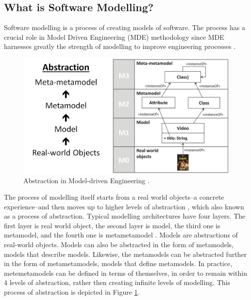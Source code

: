 \documentclass[12pt, a4paper]{report}
\begin{document}
\subsection{What is Software Modelling?}
Software modelling is a process of creating models of software. The process has a crucial role in Model Driven Engineering (MDE) methodology since MDE harnesses greatly the strength of modelling to improve engineering processes \cite{brambilla2012model}.  

\begin{figure}[!b]
\centering
\includegraphics[width=13cm]{abstraction}
\caption{Abstraction in Model-driven Engineering \cite{brambilla2012model}.}
\label{abstraction}
\end{figure}

The process of modelling itself starts from a real world objects--a concrete experience--and then moves up to higher levels of abstraction \cite{white2010teaching, engels2005teaching}, which also known as a process of abstraction. Typical modelling architectures have four layers. The first layer is real world object, the second layer is model, the third one is metamodel, and the fourth one is metametamodel \cite{brambilla2012model}. Models are abstractions of real-world objects. Models can also be abstracted in the form of metamodels, models that describe models. Likewise, the metamodels can be abstracted further in the form of metametamodels, models that define metamodels. In practice, metemetamodels can be defined in terms of themselves, in order to remain within 4 levels of abstraction, rather then creating infinite levels of modelling. This process of abstraction is depicted in Figure \ref{abstraction}.
 
\end{document}
